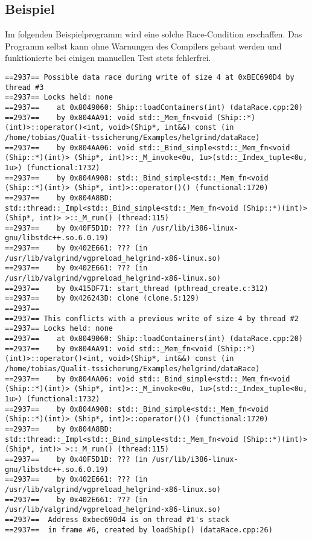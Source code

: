 \subsection{Beispiel}
Im folgenden Beispielprogramm wird eine solche Race-Condition erschaffen. Das Programm selbst kann ohne Warnungen des Compilers gebaut werden und funktionierte bei einigen manuellen Test stets fehlerfrei.
\begin{singlespace}
\begin{scriptsize}


\begin{lstlisting}
==2937== Possible data race during write of size 4 at 0xBEC690D4 by thread #3
==2937== Locks held: none
==2937==    at 0x8049060: Ship::loadContainers(int) (dataRace.cpp:20)
==2937==    by 0x804AA91: void std::_Mem_fn<void (Ship::*)(int)>::operator()<int, void>(Ship*, int&&) const (in /home/tobias/Qualit-tssicherung/Examples/helgrind/dataRace)
==2937==    by 0x804AA06: void std::_Bind_simple<std::_Mem_fn<void (Ship::*)(int)> (Ship*, int)>::_M_invoke<0u, 1u>(std::_Index_tuple<0u, 1u>) (functional:1732)
==2937==    by 0x804A908: std::_Bind_simple<std::_Mem_fn<void (Ship::*)(int)> (Ship*, int)>::operator()() (functional:1720)
==2937==    by 0x804A8BD: std::thread::_Impl<std::_Bind_simple<std::_Mem_fn<void (Ship::*)(int)> (Ship*, int)> >::_M_run() (thread:115)
==2937==    by 0x40F5D1D: ??? (in /usr/lib/i386-linux-gnu/libstdc++.so.6.0.19)
==2937==    by 0x402E661: ??? (in /usr/lib/valgrind/vgpreload_helgrind-x86-linux.so)
==2937==    by 0x402E661: ??? (in /usr/lib/valgrind/vgpreload_helgrind-x86-linux.so)
==2937==    by 0x415DF71: start_thread (pthread_create.c:312)
==2937==    by 0x426243D: clone (clone.S:129)
==2937== 
==2937== This conflicts with a previous write of size 4 by thread #2
==2937== Locks held: none
==2937==    at 0x8049060: Ship::loadContainers(int) (dataRace.cpp:20)
==2937==    by 0x804AA91: void std::_Mem_fn<void (Ship::*)(int)>::operator()<int, void>(Ship*, int&&) const (in /home/tobias/Qualit-tssicherung/Examples/helgrind/dataRace)
==2937==    by 0x804AA06: void std::_Bind_simple<std::_Mem_fn<void (Ship::*)(int)> (Ship*, int)>::_M_invoke<0u, 1u>(std::_Index_tuple<0u, 1u>) (functional:1732)
==2937==    by 0x804A908: std::_Bind_simple<std::_Mem_fn<void (Ship::*)(int)> (Ship*, int)>::operator()() (functional:1720)
==2937==    by 0x804A8BD: std::thread::_Impl<std::_Bind_simple<std::_Mem_fn<void (Ship::*)(int)> (Ship*, int)> >::_M_run() (thread:115)
==2937==    by 0x40F5D1D: ??? (in /usr/lib/i386-linux-gnu/libstdc++.so.6.0.19)
==2937==    by 0x402E661: ??? (in /usr/lib/valgrind/vgpreload_helgrind-x86-linux.so)
==2937==    by 0x402E661: ??? (in /usr/lib/valgrind/vgpreload_helgrind-x86-linux.so)
==2937==  Address 0xbec690d4 is on thread #1's stack
==2937==  in frame #6, created by loadShip() (dataRace.cpp:26)

\end{lstlisting}
\end{scriptsize}
\end{singlespace}

